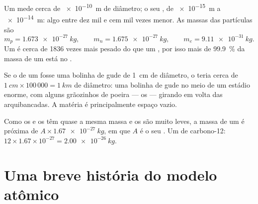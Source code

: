 \begin{proposition}\label{prop:g9:inside-the-atom:sizes}
Um  mede cerca de \qty{e-10}{m} de diâmetro; o seu , de
\qty{e-15}{m} a \qty{e-14}{m}: algo entre dez mil e cem mil vezes menor.
As massas das partículas são
\[
  m_p = \qty{1.673e-27}{kg},\qquad m_n = \qty{1.675e-27}{kg},\qquad
  m_e = \qty{9.11e-31}{kg}.
\]
Um  é cerca de 1836 vezes mais pesado do que um , por isso
mais de \qty{99.9}{\percent} da massa de um  está no .
\end{proposition}

\begin{example}\label{ex:g9:inside-the-atom:marble}
Se o  de um  fosse uma bolinha de gude de \qty{1}{cm} de
diâmetro, o  teria cerca de
$\qty{1}{cm} \times 100\,000 = \qty{1}{km}$ de diâmetro: uma bolinha de
gude no meio de um estádio enorme, com alguns grãozinhos de poeira ---
os  --- girando em volta das arquibancadas. A matéria é
principalmente espaço vazio.
\end{example}

\begin{method}\label{met:g9:inside-the-atom:mass}
Como os  e os  têm quase a mesma massa e os  são
muito leves, a massa de um  é próxima de $A \times
\qty{1.67e-27}{kg}$, em que $A$ é o seu . Um  de
carbono-12:
$12 \times 1.67 \times 10^{-27} = \qty{2.00e-26}{kg}$.
\end{method}

\section{Uma breve história do modelo atômico}

